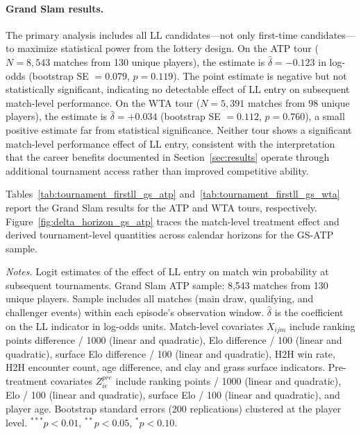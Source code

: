 \paragraph{Grand Slam results.} The primary analysis includes all LL candidates---not only first-time candidates---to maximize statistical power from the lottery design. On the ATP tour ($N = 8{,}543$ matches from 130 unique players), the estimate is $\hat{\delta} = -0.123$ in log-odds (bootstrap SE $= 0.079$, $p = 0.119$). The point estimate is negative but not statistically significant, indicating no detectable effect of LL entry on subsequent match-level performance. On the WTA tour ($N = 5{,}391$ matches from 98 unique players), the estimate is $\hat{\delta} = +0.034$ (bootstrap SE $= 0.112$, $p = 0.760$), a small positive estimate far from statistical significance. Neither tour shows a significant match-level performance effect of LL entry, consistent with the interpretation that the career benefits documented in Section~\ref{sec:results} operate through additional tournament access rather than improved competitive ability.

Tables~\ref{tab:tournament_firstll_gs_atp} and~\ref{tab:tournament_firstll_gs_wta} report the Grand Slam results for the ATP and WTA tours, respectively. Figure~\ref{fig:delta_horizon_gs_atp} traces the match-level treatment effect and derived tournament-level quantities across calendar horizons for the GS-ATP sample.

\begin{table}[htbp]
\centering
\caption{Grand Slam Tournament Performance: ATP}
\label{tab:tournament_firstll_gs_atp}
\begin{threeparttable}
\small

\begin{tablenotes}
\footnotesize
\item \textit{Notes.} Logit estimates of the effect of LL entry on match win probability at subsequent tournaments. Grand Slam ATP sample: 8,543 matches from 130 unique players. Sample includes all matches (main draw, qualifying, and challenger events) within each episode's observation window. $\hat{\delta}$ is the coefficient on the LL indicator in log-odds units. Match-level covariates $X_{ijm}$ include ranking points difference / 1000 (linear and quadratic), Elo difference / 100 (linear and quadratic), surface Elo difference / 100 (linear and quadratic), H2H win rate, H2H encounter count, age difference, and clay and grass surface indicators. Pre-treatment covariates $Z^{pre}_{ie}$ include ranking points / 1000 (linear and quadratic), Elo / 100 (linear and quadratic), surface Elo / 100 (linear and quadratic), and player age. Bootstrap standard errors (200 replications) clustered at the player level. $^{***}p<0.01$, $^{**}p<0.05$, $^{*}p<0.10$.
\end{tablenotes}
\end{threeparttable}
\end{table}

